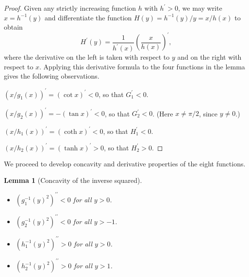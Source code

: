 \documentclass[12pt,reqno]{amsart}
\newtheorem{lemma}[lemma]{Lemma}
\theoremstyle{definition}
\newcommand{\h}{H}
\newcommand{\go}{G_1}
\newcommand{\gt}{G_2}
\newcommand{\ho}{H_1}
\newcommand{\htwo}{H_2}
\begin{document}
%
\begin{proof}
Given any strictly increasing function $h$ with $h^\prime>0$, we may write $x=h^{-1}(y)$ and differentiate the function $\h(y)=h^{-1}(y)/y=x/h(x)$ to obtain 
%
\begin{equation} \label{Hprime}
\h^\prime(y) = \frac{1}{h^\prime(x)} \left( \frac{x}{h(x)} \right)^{\! \prime} ,
\end{equation}
%
where the derivative on the left is taken with respect to $y$ and on the right with respect to $x$. Applying this derivative formula to the four functions in the lemma gives the following observations. 

$(x/g_1(x))^\prime = (\cot x)^\prime<0$, so that $\go^\prime < 0$.

$(x/g_2(x))^\prime = -(\tan x)^\prime<0$, so that $\gt^\prime < 0$. (Here $x \neq \pi/2$, since $y \neq 0$.)

$(x/h_1(x))^\prime = (\coth x)^\prime<0$, so that $\ho^\prime < 0$.

$(x/h_2(x))^\prime = (\tanh x)^\prime>0$, so that $\htwo^\prime > 0$.
\end{proof}
%
We proceed to develop concavity and derivative properties of the eight functions. 
%
\begin{lemma}[Concavity of the inverse squared]\label{concaveinverse}\ 
%
\begin{itemize}
\item[(i)] $(g_1^{-1}(y)^2)^{\prime \prime}<0$ for all $y>0$. 
\item[(ii)] $(g_2^{-1}(y)^2)^{\prime \prime}<0$ for all $y> -1$. 
\item[(iii)] $(h_1^{-1}(y)^2)^{\prime \prime}>0$ for all $y>0$. 
\item[(iv)] $(h_2^{-1}(y)^2)^{\prime \prime}>0$ for all $y>1$. 
\end{itemize}
%
\end{lemma}
%
\end{document}
